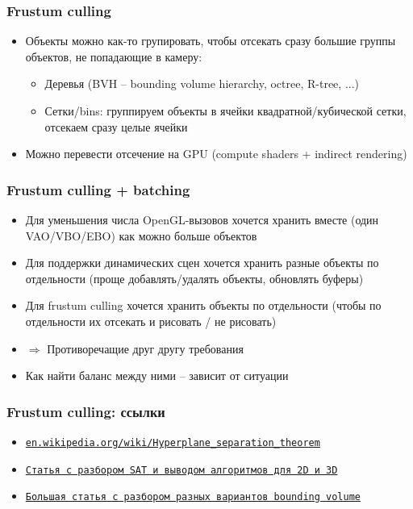 \documentclass{beamer}
\begin{document}
\begin{frame}[fragile]
\frametitle{Frustum culling}
\begin{itemize}
\item Объекты можно как-то групировать, чтобы отсекать сразу большие группы объектов, не попадающие в камеру:
\pause
\begin{itemize}
\item Деревья (BVH -- bounding volume hierarchy, octree, R-tree, ...)
\pause
\item Сетки/bins: группируем объекты в ячейки квадратной/кубической сетки, отсекаем сразу целые ячейки
\end{itemize}
\pause
\item Можно перевести отсечение на GPU (compute shaders + indirect rendering)
\end{itemize}
\end{frame}

\begin{frame}[fragile]
\frametitle{Frustum culling + batching}
\begin{itemize}
\item Для уменьшения числа OpenGL-вызовов хочется хранить вместе (один VAO/VBO/EBO) как можно больше объектов
\pause
\item Для поддержки динамических сцен хочется хранить разные объекты по отдельности (проще добавлять/удалять объекты, обновлять буферы)
\pause
\item Для frustum culling хочется хранить объекты по отдельности (чтобы по отдельности их отсекать и рисовать / не рисовать)
\pause
\item \begin{math}\Longrightarrow\end{math} Противоречащие друг другу требования
\pause
\item Как найти баланс между ними -- зависит от ситуации 
\end{itemize}
\end{frame}

\begin{frame}[fragile]
\frametitle{Frustum culling: ссылки}
\begin{footnotesize}
\begin{itemize}
\item \href{https://en.wikipedia.org/wiki/Hyperplane_separation_theorem}{\texttt{en.wikipedia.org/wiki/Hyperplane\_separation\_theorem}}
\item \href{https://www.geometrictools.com/Documentation/MethodOfSeparatingAxes.pdf}{\texttt{Статья с разбором SAT и выводом алгоритмов для 2D и 3D}}
\item \href{https://learnopengl.com/Guest-Articles/2021/Scene/Frustum-Culling}{\texttt{Большая статья с разбором разных вариантов bounding volume}}
\end{itemize}
\end{footnotesize}
\end{frame}
\end{document}
